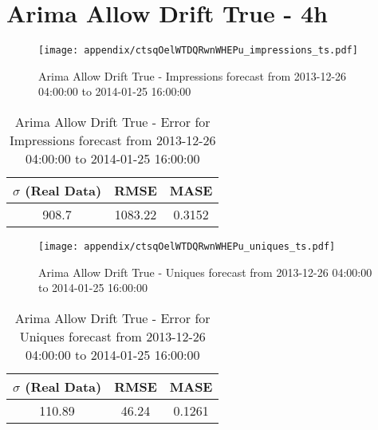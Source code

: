 \section{Arima Allow Drift True - 4h}
\begin{figure}[H] \begin{center} \leavevmode
\texttt{[image: appendix/ctsqOelWTDQRwnWHEPu\_impressions\_ts.pdf]} \caption{
Arima Allow Drift True - Impressions forecast from 2013-12-26 04:00:00 to 2014-01-25 16:00:00} \label{fig:appendix/ctsqOelWTDQRwnWHEPu_impressions_ts.pdf} \end{center}
\end{figure}

\begin{table}[H]
\centering
\footnotesize
\begin{tabular}{ccc}
$\sigma$ (Real Data) & RMSE & MASE   \\ \hline
908.7 & 1083.22 & 0.3152 \\
\end{tabular}

\vspace{0.5cm}

\caption{
Arima Allow Drift True - Error for Impressions forecast from 2013-12-26 04:00:00 to 2014-01-25 16:00:00}
\end{table}

\begin{figure}[H] \begin{center} \leavevmode
\texttt{[image: appendix/ctsqOelWTDQRwnWHEPu\_uniques\_ts.pdf]} \caption{
Arima Allow Drift True - Uniques forecast from 2013-12-26 04:00:00 to 2014-01-25 16:00:00} \label{fig:appendix/ctsqOelWTDQRwnWHEPu_uniques_ts.pdf} \end{center}
\end{figure}

\begin{table}[H]
\centering
\footnotesize
\begin{tabular}{ccc}
$\sigma$ (Real Data) & RMSE & MASE   \\ \hline
110.89 & 46.24 & 0.1261 \\
\end{tabular}

\vspace{0.5cm}

\caption{
Arima Allow Drift True - Error for Uniques forecast from 2013-12-26 04:00:00 to 2014-01-25 16:00:00}
\end{table}


